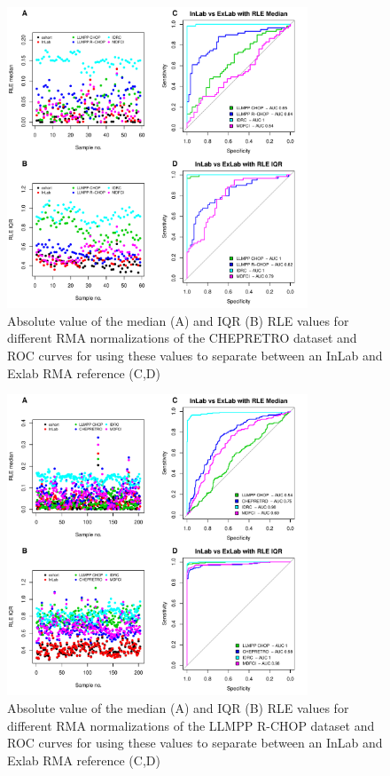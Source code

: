 \begin{figure}[!h]
	\begin{center}
		\includegraphics[width=0.8\textwidth]{figures/chep_rle.pdf}
	\end{center}
	\caption{Absolute value of the median (A) and IQR (B) RLE values for different RMA normalizations of the CHEPRETRO dataset and ROC curves for using these values to separate between an InLab and Exlab RMA reference (C,D)}
	\label{fig:chep_rle}
\end{figure}

\begin{figure}[!h]
	\begin{center}
		\includegraphics[width=0.8\textwidth]{figures/RCHOP_rle.pdf}
	\end{center}
	\caption{Absolute value of the median (A) and IQR (B) RLE values for different RMA normalizations of the LLMPP R-CHOP dataset and ROC curves for using these values to separate between an InLab and Exlab RMA reference (C,D)}
	\label{fig:rchop_rle}
\end{figure}

